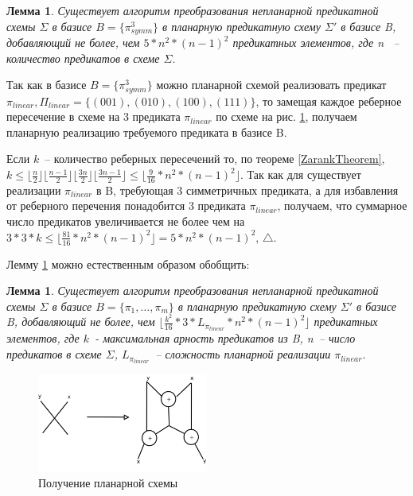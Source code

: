 \documentclass[12pt]{article}
\newtheorem{lemma}[theorem]{Лемма}
\newenvironment{proof}[1][Доказательство]{\begin{trivlist}
\item[\hskip \labelsep {\bfseries #1}]}{\end{trivlist}}
\begin{document}
\label{planar_basis}
\begin{lemma}
\label{eq:planar_algo}
Существует алгоритм преобразования непланарной предикатной схемы $\Sigma$ в базисе $B=\{\pi_{symm}^3\}$
в планарную предикатную схему $\Sigma'$ в базисе B, добавляющий не более, чем 
$5 * n^2*(n-1)^2 $ предикатных элементов, где n ~-- количество предикатов в схеме $\Sigma$.
\end{lemma}
\begin{proof}
Так как в базисе $B=\{\pi_{symm}^3\}$ можно планарной схемой реализовать предикат 
$\pi_{linear}, \Pi_{linear} = \{ (001), (010), (100), (111) \}$, то замещая каждое реберное пересечение в схеме на 
3 предиката $\pi_{linear}$ по схеме на рис. \ref{fig:xor}, получаем планарную реализацию требуемого предиката
в базисе B.

Если $k$~-- количество реберных пересечений то, по теореме \ref{ZarankTheorem}, 
$k \leq \lfloor \frac{n}{2} \rfloor \lfloor \frac{n-1}{2} \rfloor \lfloor \frac{3n}{2} \rfloor \lfloor \frac{3n-1}{2} \rfloor \le \lfloor \frac{9}{16} * n^2*(n-1)^2 \rfloor$.
Так как для существует реализации $\pi_{linear}$ в B, требующая 3 симметричных предиката, а для избавления
от реберного перечения понадобится 3 предиката $\pi_{linear}$, получаем, 
что суммарное число предикатов увеличивается не более чем на
$3*3*k \leq \lfloor \frac{81}{16} * n^2 * (n-1)^2 \rfloor = 5 * n^2 * (n-1)^2$, $\bigtriangleup$.
\end{proof}

Лемму \ref{eq:planar_algo} можно естественным образом обобщить:
\begin{lemma}
\label{general_planar_algo_complexity}
Существует алгоритм преобразования непланарной предикатной схемы $\Sigma$ в базисе $B = \{\pi_1, \dots, \pi_m \}$
в планарную предикатную схему $\Sigma'$ в базисе B, добавляющий не более, чем $\lfloor \frac{k^2}{16} * 3 * L_{\pi_{linear}} * n^2*(n-1)^2 \rfloor$ 
предикатных элементов, где $k$~- максимальная арность предикатов из B, n~-- число предикатов в схеме $\Sigma$, 
$L_{\pi_{linear}}$~-- сложность планарной реализации $\pi_{linear}$.
\end{lemma}

\begin{figure}[htb]
\centering
\includegraphics[width=0.5\textwidth]{intersection.png}
\caption{Получение планарной схемы}
\label{fig:xor}
\end{figure}
\end{document}
